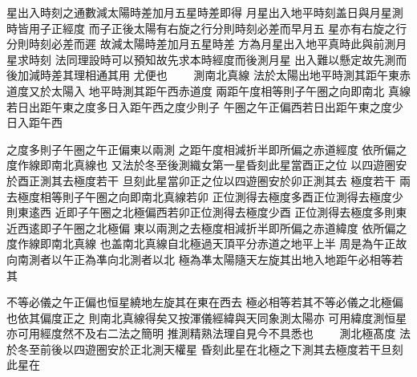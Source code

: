 \begin{正文}
\par
星出入時刻之通數減太陽時差加月五星時差即得
月星出入地平時刻盖日與月星測時皆用子正經度
而子正後太陽有右旋之行分則時刻必差而早月五
星亦有右旋之行分則時刻必差而遲
故減太陽時差加月五星時差
方為月星出入地平真時此與前測月星求時刻
法同理設時可以預知故先求本時經度而後測月星
出入難以懸定故先測而後加減時差其理相通其用
尤便也
　　測南北真線
法於太陽出地平時測其距午東赤道度又於太陽入
地平時測其距午西赤道度
兩距午度相等則子午圏之向即南北
真線若日出距午東之度多日入距午西之度少則子
午圏之午正偏西若日出距午東之度少日入距午西
\par
之度多則子午圏之午正偏東以兩測
之距午度相減折半即所偏之赤道經度
依所偏之度作線即南北真線也
又法於冬至後測織女第一星昏刻此星當酉正之位
以四遊圏安於酉正測其去極度若干
旦刻此星當卯正之位以四遊圏安於卯正測其去
極度若干
兩去極度相等則子午圏之向即南北真線若卯
正位測得去極度多酉正位測得去極度少則東逺西
近即子午圈之北極偏西若卯正位測得去極度少酉
正位測得去極度多則東近西逺即子午圈之北極偏
東以兩測之去極度相減折半即所偏之赤道緯度
依所偏之度作線即南北真線
也盖南北真線自北極過天頂平分赤道之地平上半
周是為午正故向南測者以午正為凖向北測者以北
極為凖太陽隨天左旋其出地入地距午必相等若其
\par
不等必儀之午正偏也恒星繞地左旋其在東在西去
極必相等若其不等必儀之北極偏也依其偏度正之
則南北真線得矣又按渾儀經緯與天同象測太陽亦
可用緯度測恒星亦可用經度然不及右二法之簡明
推測精熟法理自見今不具悉也
　　測北極髙度
法於冬至前後以四遊圏安於正北測天權星
昏刻此星在北極之下測其去極度若干旦刻此星在

\end{正文}

